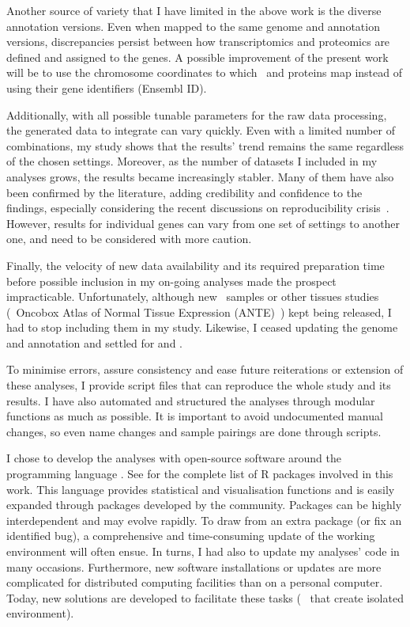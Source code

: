 Another source of variety that I have limited in the above work
is the diverse annotation versions.
Even when mapped to the same genome and annotation versions,
discrepancies persist between how transcriptomics and proteomics
are defined and assigned to the genes.
A possible improvement of the present work will be to use
the chromosome coordinates to which \mRNAs\ and proteins map
instead of using their gene identifiers (\gls{Ensembl} ID).\mybr\

Additionally, with all possible tunable parameters for the raw data processing,
the generated data to integrate can vary quickly.
Even with a limited number of combinations,
my study shows that the results' trend remains the same
regardless of the chosen settings.
Moreover, as the number of datasets I included in my analyses grows,
the results became increasingly stabler.
Many of them have also been confirmed by the literature,
adding credibility and confidence to the findings,
especially considering the recent discussions on reproducibility crisis~.
However, results for individual genes can vary from one set of settings to another one,
and need to be considered with more caution.

Finally, the velocity of new data availability
and its required preparation time
before possible inclusion in my on-going analyses
made the prospect impracticable.
Unfortunately, although new \gtex\ samples or other tissues studies
(\eg\ Oncobox Atlas of Normal Tissue Expression (ANTE)~)
kept being released,
I had to stop including them in my study.
Likewise, I ceased updating the genome and annotation
and settled for  and .

To minimise errors,
assure consistency and ease future reiterations or extension of these analyses,
I provide script files that can reproduce the whole study and its results.
I have also automated and structured the analyses through modular functions
as much as possible.
It is important to avoid undocumented manual changes,
so even name changes and sample pairings are done through scripts.\mybr\

I chose to develop the analyses with open-source software
around the programming language .
See  for the complete list of \textsf{R} packages
involved in this work.
This language provides statistical and visualisation functions
and is easily expanded through packages developed by the community.
Packages can be highly interdependent and may evolve rapidly.
To draw from an extra package (or fix an identified bug),
a comprehensive and time-consuming update of the working environment
will often ensue.
In turns, I had also to update my analyses' code in many occasions.
Furthermore, new software installations or updates are more complicated
for distributed computing facilities than on a personal computer.
Today, new solutions are developed to facilitate these tasks
(\eg\  that create isolated environment).

